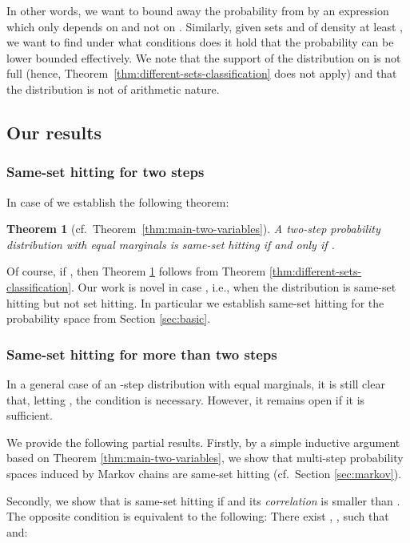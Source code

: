 \documentclass{daj}
\newcommand{\1}{\mathbbm{1}}
\theoremstyle{plain}
\newtheorem{theorem}{Theorem}[section]
\theoremstyle{definition}
\begin{document}
In other words, we want to bound away the probability from 
by an expression which only depends on  and not on .
Similarly, given sets  and  of density at least ,
we want to find under what conditions does it hold that the
probability  can be lower
bounded effectively. We note that the support of the distribution on
 is not full
(hence, Theorem~\ref{thm:different-sets-classification} does not apply)
and that the distribution is not of arithmetic nature. 
\subsection{Our results}


\subsubsection{Same-set hitting for two steps}

In case of  we establish the following theorem:
\begin{theorem}[cf.~Theorem~\ref{thm:main-two-variables}]
\label{thm:two-steps-classification}
A two-step probability distribution with equal marginals 
is same-set hitting if and only if
.
\end{theorem}

Of course, if , then Theorem \ref{thm:two-steps-classification}
follows from Theorem \ref{thm:different-sets-classification}. 
Our work is novel in case ,
i.e., when the distribution is same-set hitting but not set hitting.
In particular we establish same-set hitting
for the probability space from Section \ref{sec:basic}.

\subsubsection{Same-set hitting for more than two steps}

In a general case of an -step distribution with equal marginals, it
is still clear that, letting
, the condition
 is necessary. However, it remains
open if it is sufficient.

We provide the following partial results. Firstly, by a simple inductive argument
based on Theorem \ref{thm:main-two-variables}, we show that multi-step 
probability  spaces induced by Markov chains are same-set hitting
(cf.~Section \ref{sec:markov}).

Secondly, we show that  is same-set hitting 
if  and its 
\emph{correlation}  is smaller than . 
The opposite condition  is equivalent
to the following:
There exist , , 
 such that
 and:
\end{document}
